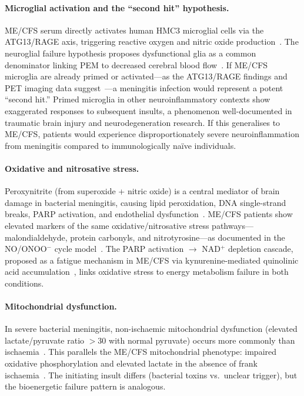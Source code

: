 \paragraph{Microglial activation and the ``second hit'' hypothesis.}
ME/CFS serum directly activates human HMC3 microglial cells via the ATG13/RAGE axis, triggering reactive oxygen and nitric oxide production~\cite{Gottschalk2022ATG13}. The neuroglial failure hypothesis proposes dysfunctional glia as a common denominator linking PEM to decreased cerebral blood flow~\cite{RenzPolster2022}. If ME/CFS microglia are already primed or activated---as the ATG13/RAGE findings and PET imaging data suggest~\cite{Gottschalk2022ATG13,Nakatomi2014neuroinflammation}---a meningitis infection would represent a potent ``second hit.'' Primed microglia in other neuroinflammatory contexts show exaggerated responses to subsequent insults, a phenomenon well-documented in traumatic brain injury and neurodegeneration research. If this generalises to ME/CFS, patients would experience disproportionately severe neuroinflammation from meningitis compared to immunologically na\"ive individuals.

\paragraph{Oxidative and nitrosative stress.}
Peroxynitrite (from superoxide + nitric oxide) is a central mediator of brain damage in bacterial meningitis, causing lipid peroxidation, DNA single-strand breaks, PARP activation, and endothelial dysfunction~\cite{Scheld1999oxidative}. ME/CFS patients show elevated markers of the same oxidative/nitrosative stress pathways---malondialdehyde, protein carbonyls, and nitrotyrosine---as documented in the NO/ONOO$^-$ cycle model~\cite{Pall2000Peroxynitrite,PaulBhatt2025oxidative}. The PARP activation $\to$ NAD$^+$ depletion cascade, proposed as a fatigue mechanism in ME/CFS via kynurenine-mediated quinolinic acid accumulation~\cite{Dehhaghi2022kynurenine}, links oxidative stress to energy metabolism failure in both conditions.

\paragraph{Mitochondrial dysfunction.}
In severe bacterial meningitis, non-ischaemic mitochondrial dysfunction (elevated lactate/pyruvate ratio $>$30 with normal pyruvate) occurs more commonly than ischaemia~\cite{Schwerk2015meningitis}. This parallels the ME/CFS mitochondrial phenotype: impaired oxidative phosphorylation and elevated lactate in the absence of frank ischaemia~\cite{Myhill2009mitochondrial,Tomas2017}. The initiating insult differs (bacterial toxins vs.\ unclear trigger), but the bioenergetic failure pattern is analogous.


